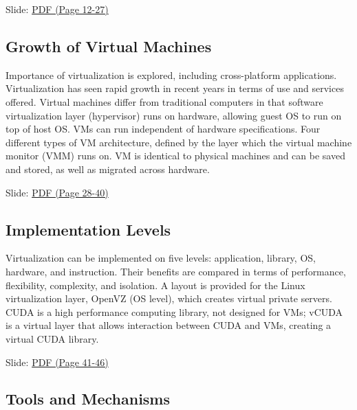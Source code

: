 
  Slide:
  \href{https://drive.google.com/open?id=0B88HKpainTSfQU1uQmxZWHdWQ1k}{PDF
  (Page 12-27)}

\subsection{Growth of Virtual Machines}

Importance of virtualization is explored, including cross-platform
applications. Virtualization has seen rapid growth in recent years in
terms of use and services offered. Virtual machines differ from
traditional computers in that software virtualization layer (hypervisor)
runs on hardware, allowing guest OS to run on top of host OS. VMs can
run independent of hardware specifications. Four different types of VM
architecture, defined by the layer which the virtual machine monitor
(VMM) runs on. VM is identical to physical machines and can be saved and
stored, as well as migrated across hardware.


  Slide:
  \href{https://drive.google.com/open?id=0B88HKpainTSfQU1uQmxZWHdWQ1k}{PDF
  (Page 28-40)}

\subsection{Implementation Levels}

Virtualization can be implemented on five levels: application, library,
OS, hardware, and instruction. Their benefits are compared in terms of
performance, flexibility, complexity, and isolation. A layout is
provided for the Linux virtualization layer, OpenVZ (OS level), which
creates virtual private servers. CUDA is a high performance computing
library, not designed for VMs; vCUDA is a virtual layer that allows
interaction between CUDA and VMs, creating a virtual CUDA library.


  Slide:
  \href{https://drive.google.com/open?id=0B88HKpainTSfQU1uQmxZWHdWQ1k}{PDF
  (Page 41-46)}

\subsection{Tools and Mechanisms}


